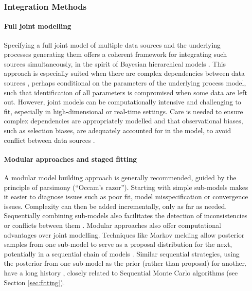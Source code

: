 \documentclass{article}
\begin{document}
\subsubsection{Integration Methods}

\paragraph{Full joint modelling}

Specifying a full joint model of multiple data sources and the underlying processes generating them offers a coherent framework for integrating such sources simultaneously, in the spirit of Bayesian hierarchical models \citep{gelman2020bayesian}. This approach is especially suited when there are complex dependencies between data sources \citep{corbella2022inferring}, perhaps conditional on the parameters of the underlying process model, such that identification of all parameters is compromised when some data are left out. However, joint models can be computationally intensive and challenging to fit, especially in high-dimensional or real-time settings. Care is needed to ensure complex dependencies are appropriately modelled and that observational biases, such as selection biases, are adequately accounted for in the model, to avoid conflict between data sources \citep{presanis2013conflict,corbella2022inferring}. 

\paragraph{Modular approaches and staged fitting}
A modular model building approach \citep{deangelis2018analysing,goudie2019joining,gelman2020bayesian,nicholson2022interoperability} is generally recommended, guided by the principle of parsimony (``Occam's razor''). 
Starting with simple sub-models makes it easier to diagnose issues such as poor fit, model misspecification or convergence issues. Complexity can then be added incrementally, only as far as needed. Sequentially combining sub-models also facilitates the detection of inconsistencies or conflicts between them \citep{presanis2013conflict,manderson2023combining}. Modular approaches also offer computational advantages over joint modelling. Techniques like Markov melding \citep{goudie2019joining} allow posterior samples from one sub-model to serve as a proposal distribution for the next, potentially in a sequential chain of models \citep{manderson2023combining}. Similar sequential strategies, using the posterior from one sub-model as the prior (rather than proposal) for another, have a long history \citep{west1997bayesian}, closely related to Sequential Monte Carlo algorithms \citep{doucet2001introduction} (see Section \ref{sec:fitting}).
\end{document}
